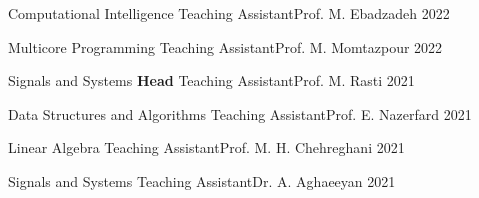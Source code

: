 
\newcommand{\taprefix}{Teaching Assistant{\enskip\cdotp\enskip}}

\begin{cvhonors}

  \cvhonor
    {Computational Intelligence} %
    {\taprefix Prof. M. Ebadzadeh} %
    {} %
    {2022} %

  \cvhonor
    {Multicore Programming} %
    {\taprefix Prof. M. Momtazpour} %
    {} %
    {2022} %

  \cvhonor
    {Signals and Systems} %
    {\textbf{Head} \taprefix Prof. M. Rasti} %
    {} %
    {2021} %

  \cvhonor
    {Data Structures and Algorithms} %
    {\taprefix Prof. E. Nazerfard} %
    {} %
    {2021} %

  \cvhonor
    {Linear Algebra} %
    {\taprefix Prof. M. H. Chehreghani} %
    {} %
    {2021} %

  \cvhonor
    {Signals and Systems} %
    {\taprefix Dr. A. Aghaeeyan} %
    {} %
    {2021} %

\end{cvhonors}
